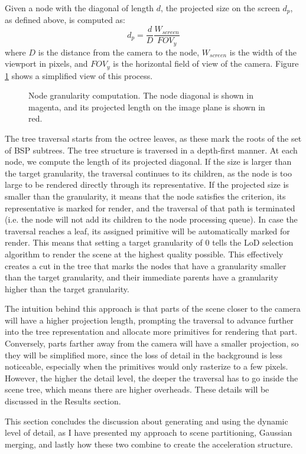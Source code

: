 Given a node with the diagonal of length $d$, the projected size on the screen $d_p$, as defined above, is computed as:
\[
d_p = \frac{d}{D}\frac{W_{screen}}{FOV_y}
\]
where $D$ is the distance from the camera to the node, $W_{screen}$ is the width of the viewport in pixels, and $FOV_y$ is the horizontal field of view of the camera. Figure \ref{fig:granularity} shows a simplified view of this process.

\begin{figure}[H]
    \centering
    
    \caption{Node granularity computation. The node diagonal is shown in magenta, and its projected length on the image plane is shown in red.}
    \label{fig:granularity}
\end{figure}


The tree traversal starts from the octree leaves, as these mark the roots of the set of BSP subtrees. The tree structure is traversed in a depth-first manner. At each node, we compute the length of its projected diagonal. If the size is larger than the target granularity, the traversal continues to its children, as the node is too large to be rendered directly through its representative. If the projected size is smaller than the granularity, it means that the node satisfies the criterion, its representative is marked for render, and the traversal of that path is terminated (i.e. the node will not add its children to the node processing queue). In case the traversal reaches a leaf, its assigned primitive will be automatically marked for render. This means that setting a target granularity of 0 tells the LoD selection algorithm to render the scene at the highest quality possible. This effectively creates a cut in the tree that marks the nodes that have a granularity smaller than the target granularity, and their immediate parents have a granularity higher than the target granularity.

The intuition behind this approach is that parts of the scene closer to the camera will have a higher projection length, prompting the traversal to advance further into the tree representation and allocate more primitives for rendering that part. Conversely, parts farther away from the camera will have a smaller projection, so they will be simplified more, since the loss of detail in the background is less noticeable, especially when the primitives would only rasterize to a few pixels. However, the higher the detail level, the deeper the traversal has to go inside the scene tree, which means there are higher overheads. These details will be discussed in the Results section.

This section concludes the discussion about generating and using the dynamic level of detail, as I have presented my approach to scene partitioning, Gaussian merging, and lastly how these two combine to create the acceleration structure.